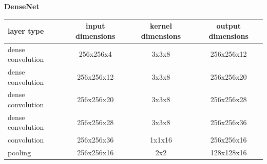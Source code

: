 \documentclass[xcolor=dvipsnames]{beamer}
\begin{document}
\begin{frame}{\bf DenseNet}
\tiny
{
  \begin{table}[]
  \centering
  \begin{tabular}{|l|c|c|c|}
  \hline
  \textbf{layer type}                       & \textbf{input dimensions} & \textbf{kernel dimensions} & \textbf{output dimensions} \\ \hline
  \cellcolor[HTML]{FD6864}dense convolution & 256x256x4                   & 3x3x8   & 256x256x12              \\ \hline
  \cellcolor[HTML]{FD6864}dense convolution & 256x256x12                  & 3x3x8   & 256x256x20              \\ \hline
  \cellcolor[HTML]{FD6864}dense convolution & 256x256x20                  & 3x3x8   & 256x256x28              \\ \hline
  \cellcolor[HTML]{FD6864}dense convolution & 256x256x28                  & 3x3x8   & 256x256x36              \\ \hline
  \cellcolor[HTML]{34CDF9}convolution       & 256x256x36                  & 1x1x16  & 256x256x16              \\ \hline
  \cellcolor[HTML]{F934CD}pooling           & 256x256x16                  & 2x2     & 128x128x16              \\ \hline
  \end{tabular}
  \end{table}
}


\end{frame}
\end{document}
